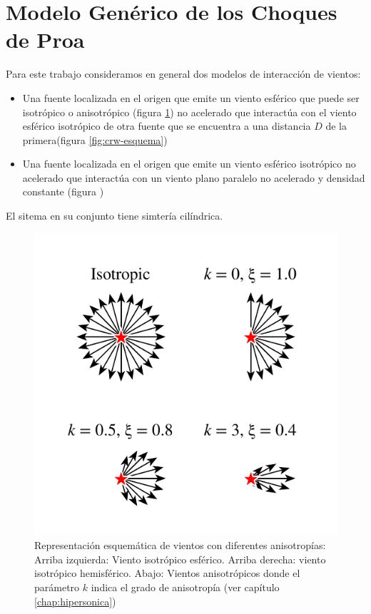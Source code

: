 \section[Modelo genérico]{Modelo Genérico de los Choques de Proa}
\label{sec:Modelo-generico}
Para este trabajo consideramos en general dos modelos de
interacción  de vientos:
\begin{itemize}
\item Una fuente localizada en el origen que emite un viento esférico
  que puede ser isotrópico o anisotrópico (figura
  \ref{fig:isotropic-aniso}) no acelerado que interactúa con el viento
  esférico isotrópico de otra fuente que se encuentra a una distancia
  $D$ de la primera(figura \ref{fig:crw-esquema})
\item Una fuente localizada en el origen que emite un viento esférico
  isotrópico no acelerado que interactúa con un viento plano paralelo
  no acelerado y densidad constante (figura )
\end{itemize}
El sitema en su conjunto tiene simtería cilíndrica.
\begin{figure}
  \includegraphics[width=0.5\linewidth]{./Figures/anisotropic-arrows}
  \caption{Representación esquemática de vientos con diferentes
    anisotropías:
    Arriba izquierda: Viento isotrópico esférico. Arriba derecha: viento
    isotrópico hemisférico. Abajo: Vientos anisotrópicos donde el
    parámetro $k$ indica el grado de anisotropía (ver capítulo \ref{chap:hipersonica})}
    \label{fig:isotropic-aniso}
\end{figure}
